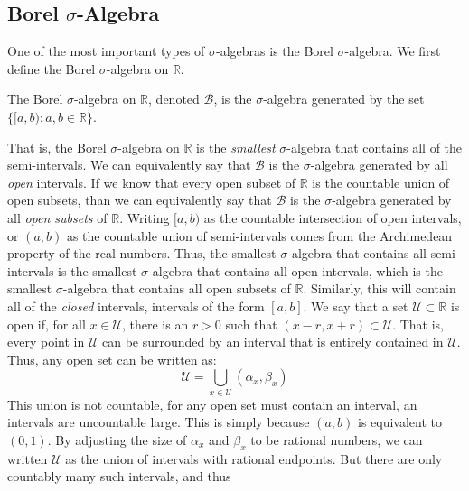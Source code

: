\subsection{Borel \texorpdfstring{$\sigma$}{Sigma}-Algebra}
    One of the most important types of $\sigma$-algebras
    is the Borel $\sigma$-algebra. We first define the
    Borel $\sigma$-algebra on $\mathbb{R}$.
    \begin{definition}
        The Borel $\sigma$-algebra on $\mathbb{R}$, denoted
        $\mathcal{B}$, is the $\sigma$-algebra generated
        by the set $\{[a,b):a,b\in\mathbb{R}\}$.
    \end{definition}
    That is, the Borel $\sigma$-algebra on $\mathbb{R}$ is
    the \textit{smallest} $\sigma$-algebra that contains
    all of the semi-intervals. We can equivalently say that
    $\mathcal{B}$ is the $\sigma$-algebra generated by all
    \textit{open} intervals. If we know that every open
    subset of $\mathbb{R}$ is the countable union of open
    subsets, than we can equivalently say that
    $\mathcal{B}$ is the $\sigma$-algebra generated by all
    \textit{open subsets} of $\mathbb{R}$. Writing $[a,b)$
    as the countable intersection of open intervals, or
    $(a,b)$ as the countable union of semi-intervals comes
    from the Archimedean property of the real numbers.
    Thus, the smallest $\sigma$-algebra that contains all
    semi-intervals is the smallest $\sigma$-algebra that
    contains all open intervals, which
    is the smallest $\sigma$-algebra that contains all open
    subsets of $\mathbb{R}$. Similarly, this will contain all
    of the \textit{closed} intervals, intervals of the form
    $[a,b]$. We say that a set $\mathcal{U}\subset\mathbb{R}$
    is open if, for all $x\in\mathcal{U}$, there is an $r>0$
    such that $(x-r,x+r)\subset\mathcal{U}$. That is, every
    point in $\mathcal{U}$ can be surrounded by an interval
    that is entirely contained in $\mathcal{U}$. Thus, any
    open set can be written as:
    \begin{equation}
        \mathcal{U}=\bigcup_{x\in\mathcal{U}}(\alpha_{x},\beta_{x})
    \end{equation}
    This union is not countable, for any open set must
    contain an interval, an intervals are uncountable large.
    This is simply because $(a,b)$ is equivalent to $(0,1)$.
    By adjusting the size of $\alpha_{x}$ and $\beta_{x}$ to
    be rational numbers, we can written $\mathcal{U}$ as the
    union of intervals with rational endpoints. But there are
    only countably many such intervals, and thus
